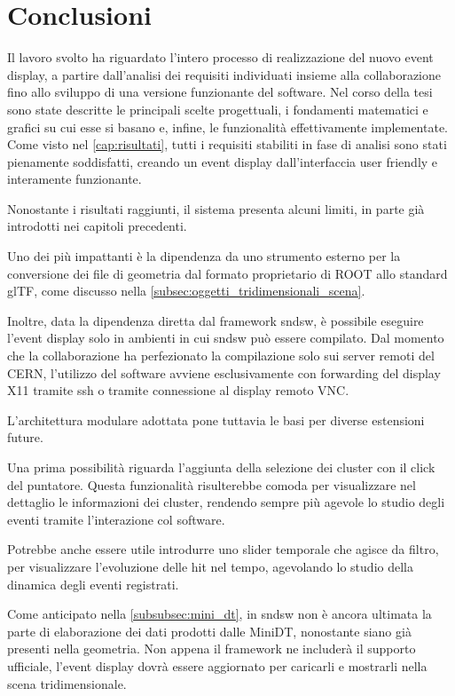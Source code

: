 \chapter*{Conclusioni}
Il lavoro svolto ha riguardato l’intero processo di realizzazione del nuovo event display, a partire dall’analisi dei requisiti individuati insieme alla collaborazione fino allo sviluppo di una versione funzionante del software.
Nel corso della tesi sono state descritte le principali scelte progettuali, i fondamenti matematici e grafici su cui esse si basano e, infine, le funzionalità effettivamente implementate.
Come visto nel \cref{cap:risultati}, tutti i requisiti stabiliti in fase di analisi sono stati pienamente soddisfatti, creando un event display dall'interfaccia user friendly e interamente funzionante.

\medskip
Nonostante i risultati raggiunti, il sistema presenta alcuni limiti, in parte già introdotti nei capitoli precedenti.

Uno dei più impattanti è la dipendenza da uno strumento esterno per la conversione dei file di geometria dal formato proprietario di ROOT allo standard glTF, come discusso nella \cref{subsec:oggetti_tridimensionali_scena}.

Inoltre, data la dipendenza diretta dal framework sndsw, è possibile eseguire l'event display solo in ambienti in cui sndsw può essere compilato.
Dal momento che la collaborazione ha perfezionato la compilazione solo sui server remoti del CERN, l'utilizzo del software avviene esclusivamente con forwarding del display X11 tramite ssh o tramite connessione al display remoto VNC.

\medskip
L'architettura modulare adottata pone tuttavia le basi per diverse estensioni future.

Una prima possibilità riguarda l'aggiunta della selezione dei cluster con il click del puntatore.
Questa funzionalità risulterebbe comoda per visualizzare nel dettaglio le informazioni dei cluster, rendendo sempre più agevole lo studio degli eventi tramite l'interazione col software.

Potrebbe anche essere utile introdurre uno slider temporale che agisce da filtro, per visualizzare l'evoluzione delle hit nel tempo, agevolando lo studio della dinamica degli eventi registrati.

Come anticipato nella \cref{subsubsec:mini_dt}, in sndsw non è ancora ultimata la parte di elaborazione dei dati prodotti dalle MiniDT, nonostante siano già presenti nella geometria.
Non appena il framework ne includerà il supporto ufficiale, l'event display dovrà essere aggiornato per caricarli e mostrarli nella scena tridimensionale.


